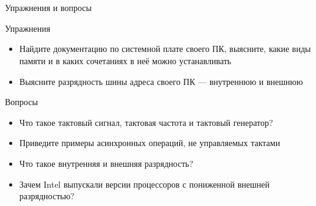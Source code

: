 \documentclass[xetex,aspectratio=43]{beamer}
\begin{document}
\section*{}

\begin{frame}{Упражнения и вопросы}
        \begin{block}{Упражнения}
    \begin{itemize}
        \tightlist
        \item
        Найдите документацию по системной плате своего ПК, выясните, какие
        виды памяти и в каких сочетаниях в неё можно устанавливать
        \item
        Выясните разрядность шины адреса своего ПК --- внутреннюю и внешнюю
    \end{itemize}
\end{block}

\begin{block}{Вопросы}
    \begin{itemize}
        \tightlist
        \item
        Что такое тактовый сигнал, тактовая частота и тактовый генератор?
        \item
        Приведите примеры асинхронных операций, не управляемых тактами
        \item
        Что такое внутренняя и внешняя разрядность?
        \item
        Зачем Intel выпускали версии процессоров с пониженной внешней разрядностью?
    \end{itemize}
\end{block}
\end{frame}

\postamble
\end{document}
